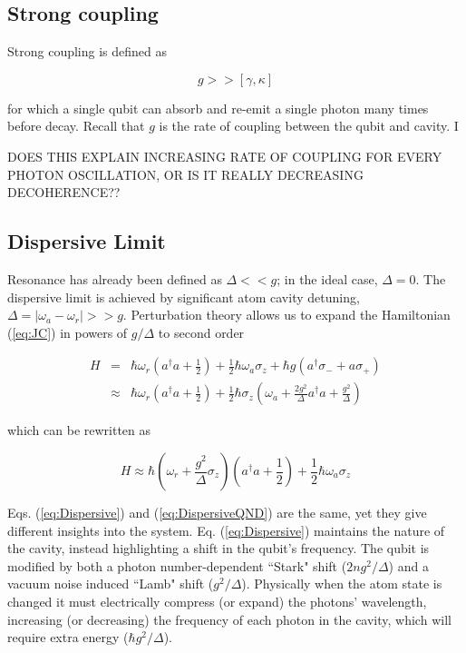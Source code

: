 \documentclass[12 pt]{book}
\begin{document}
\subsection{Strong coupling}\label{sec:StrongCoupling}
Strong coupling is defined as 

\begin{equation}
g>>[\gamma, \kappa]
\end{equation}

for which a single qubit can absorb and re-emit a single photon many times before decay. Recall that $g$ is the rate of coupling between the qubit and cavity. I

DOES THIS EXPLAIN INCREASING RATE OF COUPLING FOR EVERY PHOTON OSCILLATION, OR IS IT REALLY DECREASING DECOHERENCE??


\subsection{Dispersive Limit}
Resonance has already been defined as $\Delta << g$; in the ideal case, $\Delta=0$. The dispersive limit is achieved by significant atom cavity detuning, $\Delta=|\omega_a-\omega_r| >> g$. Perturbation theory allows us to expand the Hamiltonian (\ref{eq:JC}) in powers of $g/\Delta$ to second order

\begin{eqnarray}
H&=&\hbar \omega_r\left(a^\dag a + \frac{1}{2}\right) + \frac{1}{2}\hbar \omega_a \sigma_z + \hbar g(a^\dag \sigma_- + a\sigma_+) \\
&\approx& \hbar\omega_r \left( a^\dag a +\frac{1}{2}\right)+\frac{1}{2}\hbar\sigma_z\left(\omega_a+\frac{2g^2}{\Delta}a^\dag a +\frac{g^2}{\Delta}\right) \label{eq:Dispersive}
\end{eqnarray}

which can be rewritten as 

\begin{equation}
H\approx \hbar\left( \omega_r+\frac{g^2}{\Delta}\sigma_z\right) \left(a^\dag a+\frac{1}{2}\right)+\frac{1}{2}\hbar\omega_a\sigma_z\label{eq:DispersiveQND}
\end{equation}

Eqs. (\ref{eq:Dispersive}) and (\ref{eq:DispersiveQND}) are the same, yet they give different insights into the system. Eq. (\ref{eq:Dispersive}) maintains the nature of the cavity, instead highlighting a shift in the qubit's frequency. The qubit is modified by both a photon number-dependent ``Stark" shift ($2ng^2/\Delta$) and a vacuum noise induced ``Lamb" shift ($g^2/\Delta$). Physically when the atom state is changed it must electrically compress (or expand) the photons' wavelength, increasing (or decreasing) the frequency of each photon in the cavity, which will require extra energy ($\hbar g^2/\Delta$).
\end{document}

